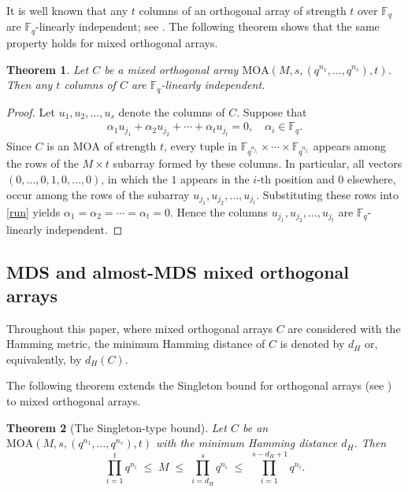 \documentclass[11pt]{article}
\newtheorem{Theorem}{Theorem}[section]
\newtheorem{Definition and Notation}[Theorem]{Definition and Notation}
\begin{document}
It is well known that any $t$ columns of an orthogonal array of strength $t$ over $\mathbb{F}_q$ are $\mathbb{F}_q$-linearly independent; see \cite[Theorem 3.27]{HSS2012}. The following theorem shows that the same property holds for mixed orthogonal arrays.

\begin{Theorem}\label{ma16}
Let $C$ be a mixed orthogonal array $\mathrm{MOA}(M,s,(q^{n_1},\dots,q^{n_s}),t)$. Then any $t$ columns of $C$ are $\mathbb{F}_q$-linearly independent.
\end{Theorem}
\begin{proof}
Let $u_1,u_2,\ldots,u_s$ denote the columns of $C$.  Suppose that
\begin{align}\label{run}
    \alpha_1 u_{j_1}+\alpha_2 u_{j_2}+\cdots+\alpha_t u_{j_t}=0, \quad\alpha_i\in\mathbb{F}_q.
\end{align}
Since $C$ is an $\mathrm{MOA}$ of strength $t$, every tuple in  $\mathbb{F}_{q^{n_{j_1}}}\times\cdots\times\mathbb{F}_{q^{n_{j_t}}}$ appears among the rows of the $M\times t$ subarray formed by these columns. In particular, all vectors $(0,\dots,0,1,0,\dots,0)$, in which the $1$ appears in the $i$-th position and $0$ elsewhere, occur among the rows of the subarray $u_{j_1},u_{j_2},\ldots,u_{j_t}$.
Substituting these rows into \eqref{run} yields $\alpha_1=\alpha_2=\cdots=\alpha_t=0$. Hence the columns $u_{j_1},u_{j_2},\ldots,u_{j_t}$ are $\mathbb{F}_q$-linearly independent.
\end{proof}


\subsection{MDS and almost-MDS mixed orthogonal arrays}

Throughout this paper, where mixed orthogonal arrays $C$ are considered with the Hamming metric, the minimum Hamming distance of $C$ is denoted by $d_H$ or, equivalently, by $d_H(C)$.


The following theorem extends the Singleton bound for orthogonal arrays (see \cite[Theorem 4.20]{HSS2012}) to mixed orthogonal arrays.

\begin{Theorem}[The Singleton-type bound]\label{Singleton}
Let $C$ be an $\mathrm{MOA}(M, s, (q^{n_1},\dots, q^{n_s}), t)$ with the minimum Hamming distance $d_H$. Then 
\begin{equation}\label{eq:m61}
    \prod_{i=1}^{t} q^{n_i} \;\leq\; M \;\leq\; \prod_{i=d_H}^{s} q^{n_i} \;\leq\; \prod_{i=1}^{\,s-d_H+1} q^{n_i}.
\end{equation}
\end{Theorem}
\end{document}
